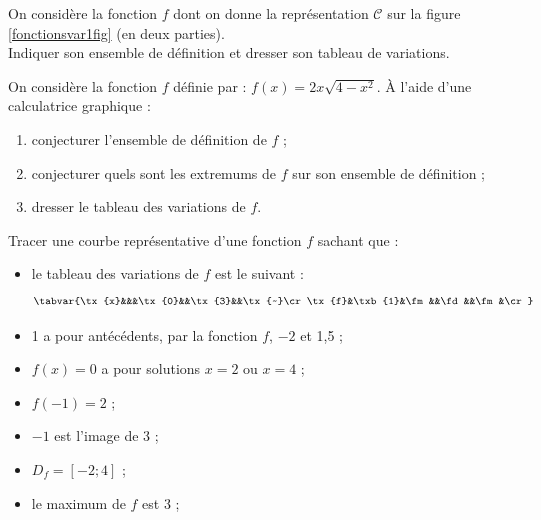\begin{multicols}{2}

\begin{exo}\label{fonctionsvar1}
On consid\`ere la fonction $f$ dont on donne la repr\'esentation $\mathcal{C}$ sur la figure \ref{fonctionsvar1fig}  (en deux parties).\\
Indiquer son ensemble de d\'efinition et dresser son tableau de variations.

\end{exo}


\begin{exo}
On consid\`ere la fonction $f$ d\'efinie par : $f(x)=2x\sqrt{4-x^2}$.
\`A l'aide d'une calculatrice graphique :
\begin{enumerate}
	\item conjecturer l'ensemble de d\'efinition de $f$ ;
	\item conjecturer quels sont les extremums de $f$ sur son ensemble de d\'efinition ;
	\item dresser le tableau des variations de $f$.
\end{enumerate}
\end{exo}




\begin{exo}
Tracer une courbe repr\'esentative d'une fonction $f$ sachant que :
\begin{itemize}
\item le tableau des variations de $f$ est le suivant :$$\tabvar{%
\tx{x}&&&\tx{0}&&\tx{3}&&\tx{~}\cr
\tx{f}&\txb{1}&\fm&&\fd&&\fm&\cr
}$$
	\item 1 a pour ant\'ec\'edents, par la fonction $f$, $-2$ et 1,5 ;
	\item $f(x)=0$ a pour solutions $x=2$ ou $x=4$ ;
	\item $f(-1)=2$ ;
	\item $-1$ est l'image de 3 ;
	\item $D_f=[-2;4]$ ;
	\item le maximum de $f$ est 3 ;
	
\end{itemize}%
\end{exo}



\sautcol


\end{multicols}
